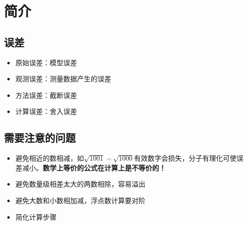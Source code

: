 
\section{简介}
\subsection{误差}
\begin{itemize}
	\item 原始误差：模型误差
	\item 观测误差：测量数据产生的误差
	\item 方法误差：截断误差
	\item 计算误差：舍入误差
\end{itemize}

\subsection{需要注意的问题}
\begin{itemize}
	\item 避免相近的数相减，如$\sqrt{1001}-\sqrt{1000}$有效数字会损失，分子有理化可使误差减小。\textbf{数学上等价的公式在计算上是不等价的！}
	\item 避免数量级相差太大的两数相除，容易溢出
	\item 避免大数和小数相加减，浮点数计算要对阶
	\item 简化计算步骤
\end{itemize}